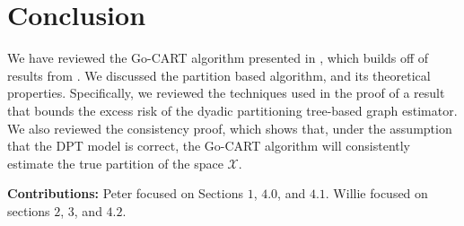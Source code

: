 \documentclass[12pt]{article}
\begin{document}




\section{Conclusion}

We have reviewed the Go-CART algorithm presented in \cite{liu2010},
which builds off of results from \cite{friedman2008}. We discussed the
partition based algorithm, and its theoretical
properties. Specifically, we reviewed the techniques used in the proof
of a result that bounds the excess risk of the dyadic partitioning
tree-based graph estimator. We also reviewed the consistency proof,
which shows that, under the assumption that the DPT model is correct,
the Go-CART algorithm will consistently estimate the true partition of
the space $\mathcal{X}$.

\textbf{Contributions:} Peter focused on Sections $1$, $4.0$, and $4.1$. Willie focused on sections $2$, $3$, and $4.2$.



\end{document}
